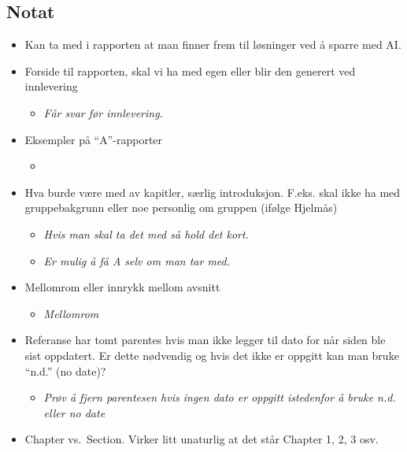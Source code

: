 \subsection*{Notat}
\begin{itemize}
\item
  Kan ta med i rapporten at man finner frem til løsninger ved å sparre
  med AI.
\item
  Forside til rapporten, skal vi ha med egen eller blir den generert ved
  innlevering

  \begin{itemize}
  \item
    \emph{Får svar før innlevering.}
  \end{itemize}
\item
  Eksempler på ``A''-rapporter

  \begin{itemize}
  \item
  \end{itemize}
\item
  Hva burde være med av kapitler, særlig introduksjon. F.eks. skal ikke
  ha med gruppebakgrunn eller noe personlig om gruppen (ifølge Hjelmås)

  \begin{itemize}
  \item
    \emph{Hvis man skal ta det med så hold det kort.}
  \item
    \emph{Er mulig å få A selv om man tar med.}
  \end{itemize}
\item
  Mellomrom eller innrykk mellom avsnitt

  \begin{itemize}
  \item
    \emph{Mellomrom}
  \end{itemize}
\item
  Referanse har tomt parentes hvis man ikke legger til dato for når
  siden ble sist oppdatert. Er dette nødvendig og hvis det ikke er
  oppgitt kan man bruke ``n.d.'' (no date)?

  \begin{itemize}
  
  \item
    \emph{Prøv å fjern parentesen hvis ingen dato er oppgitt istedenfor
    å bruke n.d. eller no date}
  \end{itemize}
\item
  Chapter vs.~Section. Virker litt unaturlig at det står Chapter 1, 2, 3
  osv.


\end{itemize}
